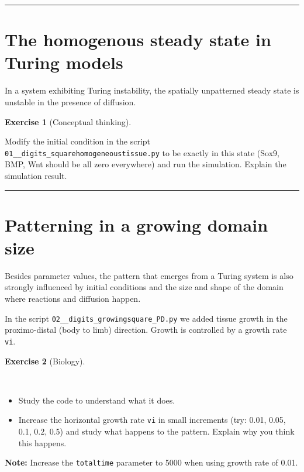 \documentclass[
  letterpaper,
  DIV=11,
  numbers=noendperiod]{scrreprt}
\providecommand{\tightlist}{%
  \setlength{\itemsep}{0pt}\setlength{\parskip}{0pt}}\usepackage{longtable,booktabs,array}
\theoremstyle{definition}
\newtheorem{exercise}{Exercise}[chapter]
\theoremstyle{remark}
\begin{document}
\begin{center}\rule{0.5\linewidth}{0.5pt}\end{center}

\section{The homogenous steady state in Turing
models}\label{the-homogenous-steady-state-in-turing-models}

In a system exhibiting Turing instability, the spatially unpatterned
steady state is unstable in the presence of diffusion.

\begin{exercise}[Conceptual
thinking]\protect\hypertarget{exr-tur}{}\label{exr-tur}

Modify the initial condition in the script
\texttt{01\_\_digits\_squarehomogeneoustissue.py} to be exactly in this
state (Sox9, BMP, Wnt should be all zero everywhere) and run the
simulation. Explain the simulation result.

\end{exercise}

\begin{center}\rule{0.5\linewidth}{0.5pt}\end{center}

\section{Patterning in a growing domain
size}\label{patterning-in-a-growing-domain-size}

Besides parameter values, the pattern that emerges from a Turing system
is also strongly influenced by initial conditions and the size and shape
of the domain where reactions and diffusion happen.

In the script \texttt{02\_\_digits\_growingsquare\_PD.py} we added
tissue growth in the proximo-distal (body to limb) direction. Growth is
controlled by a growth rate \texttt{vi}.

\begin{exercise}[Biology]\protect\hypertarget{exr-tur}{}\label{exr-tur}

~

\begin{itemize}
\tightlist
\item
  Study the code to understand what it does.\\
\item
  Increase the horizontal growth rate \texttt{vi} in small increments
  (try: 0.01, 0.05, 0.1, 0.2, 0.5) and study what happens to the
  pattern. Explain why you think this happens.
\end{itemize}

\textbf{Note:} Increase the \texttt{totaltime} parameter to 5000 when
using growth rate of 0.01.

\end{exercise}
\end{document}
